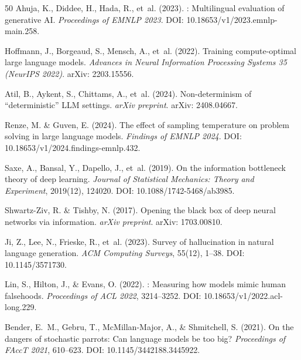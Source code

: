 \documentclass[11pt,a4paper]{article}
\begin{document}
\begin{thebibliography}{50}
Ahuja, K., Diddee, H., Hada, R., et~al. (2023).
: Multilingual evaluation of generative {AI}.
\newblock \emph{Proceedings of EMNLP 2023}.
\newblock DOI: 10.18653/v1/2023.emnlp-main.258.

Hoffmann, J., Borgeaud, S., Mensch, A., et~al. (2022).
\newblock Training compute-optimal large language models.
\newblock \emph{Advances in Neural Information Processing Systems 35
(NeurIPS 2022)}.
\newblock arXiv: 2203.15556.

Atil, B., Aykent, S., Chittams, A., et~al. (2024).
\newblock Non-determinism of ``deterministic'' {LLM} settings.
\newblock \emph{arXiv preprint}.
\newblock arXiv: 2408.04667.

Renze, M. \& Guven, E. (2024).
\newblock The effect of sampling temperature on problem solving in large
language models.
\newblock \emph{Findings of EMNLP 2024}.
\newblock DOI: 10.18653/v1/2024.findings-emnlp.432.

Saxe, A., Bansal, Y., Dapello, J., et~al. (2019).
\newblock On the information bottleneck theory of deep learning.
\newblock \emph{Journal of Statistical Mechanics: Theory and Experiment},
2019(12), 124020.
\newblock DOI: 10.1088/1742-5468/ab3985.

Shwartz-Ziv, R. \& Tishby, N. (2017).
\newblock Opening the black box of deep neural networks via information.
\newblock \emph{arXiv preprint}.
\newblock arXiv: 1703.00810.

Ji, Z., Lee, N., Frieske, R., et~al. (2023).
\newblock Survey of hallucination in natural language generation.
\newblock \emph{ACM Computing Surveys}, 55(12), 1--38.
\newblock DOI: 10.1145/3571730.

Lin, S., Hilton, J., \& Evans, O. (2022).
: Measuring how models mimic human falsehoods.
\newblock \emph{Proceedings of ACL 2022}, 3214--3252.
\newblock DOI: 10.18653/v1/2022.acl-long.229.

Bender, E.~M., Gebru, T., McMillan-Major, A., \& Shmitchell, S. (2021).
\newblock On the dangers of stochastic parrots: {C}an language models be
too big?
\newblock \emph{Proceedings of FAccT 2021}, 610--623.
\newblock DOI: 10.1145/3442188.3445922.


\end{thebibliography}
\end{document}
